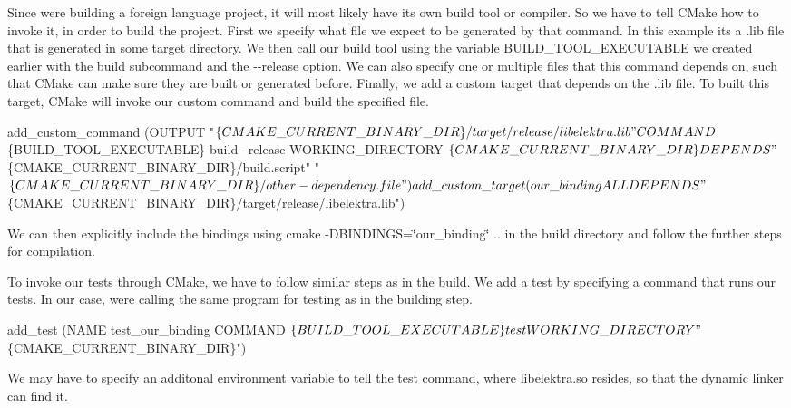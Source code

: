 Since we\textquotesingle{}re building a foreign language project, it will most likely have its own build tool or compiler. So we have to tell C\+Make how to invoke it, in order to build the project. First we specify what file we expect to be generated by that command. In this example it\textquotesingle{}s a {\ttfamily .lib} file that is generated in some target directory. We then call our build tool using the variable {\ttfamily B\+U\+I\+L\+D\+\_\+\+T\+O\+O\+L\+\_\+\+E\+X\+E\+C\+U\+T\+A\+B\+LE} we created earlier with the {\ttfamily build} subcommand and the {\ttfamily -\/-\/release} option. We can also specify one or multiple files that this command depends on, such that C\+Make can make sure they are built or generated before. Finally, we add a custom target that depends on the {\ttfamily .lib} file. To built this target, C\+Make will invoke our custom command and build the specified file.


\begin{DoxyCode}
add\_custom\_command (OUTPUT "$\{CMAKE\_CURRENT\_BINARY\_DIR\}/target/release/libelektra.lib"
            COMMAND $\{BUILD\_TOOL\_EXECUTABLE\} build --release
            WORKING\_DIRECTORY $\{CMAKE\_CURRENT\_BINARY\_DIR\}
            DEPENDS "$\{CMAKE\_CURRENT\_BINARY\_DIR\}/build.script"
       "$\{CMAKE\_CURRENT\_BINARY\_DIR\}/other-dependency.file")
add\_custom\_target (our\_binding ALL DEPENDS "$\{CMAKE\_CURRENT\_BINARY\_DIR\}/target/release/libelektra.lib")
\end{DoxyCode}


We can then explicitly include the bindings using {\ttfamily cmake -\/\+D\+B\+I\+N\+D\+I\+N\+GS=\char`\"{}our\+\_\+binding\char`\"{} ..} in the build directory and follow the further steps for \hyperlink{doc_COMPILE_md}{compilation}.

To invoke our tests through C\+Make, we have to follow similar steps as in the build. We add a test by specifying a command that runs our tests. In our case, we\textquotesingle{}re calling the same program for testing as in the building step.


\begin{DoxyCode}
add\_test (NAME test\_our\_binding COMMAND $\{BUILD\_TOOL\_EXECUTABLE\} test WORKING\_DIRECTORY
       "$\{CMAKE\_CURRENT\_BINARY\_DIR\}")
\end{DoxyCode}


We may have to specify an additonal environment variable to tell the test command, where {\ttfamily libelektra.\+so} resides, so that the dynamic linker can find it.


